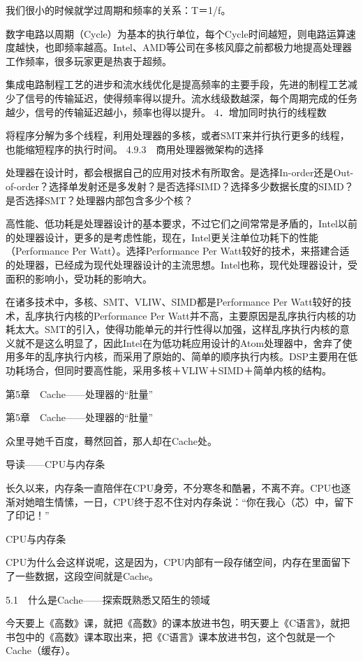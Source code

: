 \documentclass[12pt,UTF8]{ctexbook}
\begin{document}
我们很小的时候就学过周期和频率的关系：T＝1/f。

数字电路以周期（Cycle）为基本的执行单位，每个Cycle时间越短，则电路运算速度越快，也即频率越高。Intel、AMD等公司在多核风靡之前都极力地提高处理器工作频率，很多玩家更是热衷于超频。

集成电路制程工艺的进步和流水线优化是提高频率的主要手段，先进的制程工艺减少了信号的传输延迟，使得频率得以提升。流水线级数越深，每个周期完成的任务越少，信号的传输延迟越小，频率也得以提升。
4．增加同时执行的线程数

将程序分解为多个线程，利用处理器的多核，或者SMT来并行执行更多的线程，也能缩短程序的执行时间。
4.9.3　商用处理器微架构的选择

处理器在设计时，都会根据自己的应用对技术有所取舍。是选择In-order还是Out-of-order？选择单发射还是多发射？是否选择SIMD？选择多少数据长度的SIMD？是否选择SMT？处理器内部包含多少个核？

高性能、低功耗是处理器设计的基本要求，不过它们之间常常是矛盾的，Intel以前的处理器设计，更多的是考虑性能，现在，Intel更关注单位功耗下的性能（Performance Per Watt）。选择Performance Per Watt较好的技术，来搭建合适的处理器，已经成为现代处理器设计的主流思想。Intel也称，现代处理器设计，受面积的影响小，受功耗的影响大。

在诸多技术中，多核、SMT、VLIW、SIMD都是Performance Per Watt较好的技术，乱序执行内核的Performance Per Watt并不高，主要原因是乱序执行内核的功耗太大。SMT的引入，使得功能单元的并行性得以加强，这样乱序执行内核的意义就不是这么明显了，因此Intel在为低功耗应用设计的Atom处理器中，舍弃了使用多年的乱序执行内核，而采用了原始的、简单的顺序执行内核。DSP主要用在低功耗场合，但同时要高性能，采用多核＋VLIW＋SIMD＋简单内核的结构。


第5章　Cache——处理器的“肚量”


第5章　Cache——处理器的“肚量”

众里寻她千百度，蓦然回首，那人却在Cache处。



导读——CPU与内存条

长久以来，内存条一直陪伴在CPU身旁，不分寒冬和酷暑，不离不弃。CPU也逐渐对她暗生情愫，一日，CPU终于忍不住对内存条说：“你在我心（芯）中，留下了印记！”

CPU与内存条

CPU为什么会这样说呢，这是因为，CPU内部有一段存储空间，内存在里面留下了一些数据，这段空间就是Cache。


5.1　什么是Cache——探索既熟悉又陌生的领域

今天要上《高数》课，就把《高数》的课本放进书包，明天要上《C语言》，就把书包中的《高数》课本取出来，把《C语言》课本放进书包，这个包就是一个Cache（缓存）。
\end{document}
